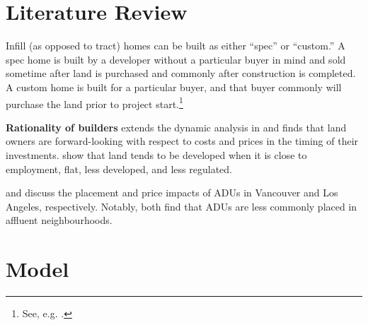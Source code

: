 \documentclass[12pt]{article}
\begin{document}
\section{Literature Review}

Infill (as opposed to tract) homes can be built as either ``spec'' or ``custom.'' A spec home is built by a developer without a particular buyer in mind and sold sometime after land is purchased and commonly after construction is completed. A custom home is built for a particular buyer, and that buyer commonly will purchase the land prior to project start.\footnote{See, e.g. \textcite{durrani2023tract}.}

\textbf{Rationality of builders}
\textcite{murphy2018dynamic} extends the dynamic analysis in \textcite{Bulan2009} and finds that land owners are forward-looking with respect to costs and prices in the timing of their investments.
\textcite{baum-snow2024microgeography} show that land tends to be developed when it is close to employment, flat, less developed, and less regulated.

\textcite{DPS} and \textcite{brueckner2024ADUs} discuss the placement and price impacts of ADUs in Vancouver and Los Angeles, respectively. Notably, both find that ADUs are less commonly placed in affluent neighbourhoods. 

\section{Model}
\end{document}
